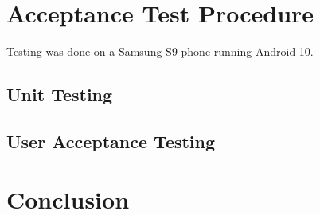 \documentclass[class=report,11pt,crop=false]{standalone}
\begin{document}
		
	
	
	\section{Acceptance Test Procedure}
	Testing was done on a Samsung S9 phone running Android 10.
	\subsection{Unit Testing}

	
	\subsection{User Acceptance Testing}
	
	\section{Conclusion}
	
	\ifstandalone
	
	\printnoidxglossary[type=\acronymtype,nonumberlist]
	\fi
\end{document}
